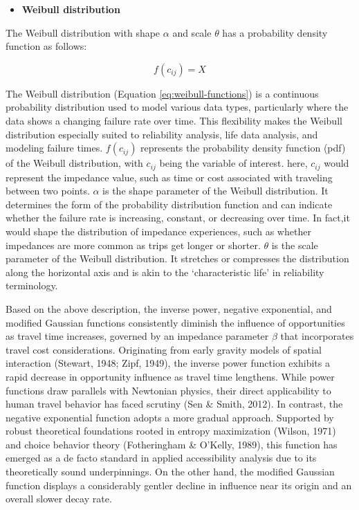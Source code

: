 \documentclass[
11pt, %
oneside, %
english, %
singlespacing, %
]{macthesis} %
\def\tightlist{}
\begin{document}
\begin{itemize}
\tightlist
\item
  \textbf{Weibull distribution}
\end{itemize}

The Weibull distribution with shape \(\alpha\) and scale \(\theta\) has a probability density function as follows:

\begin{equation}
f(c_{ij}) = X
\label{eq:weibull-functions}
\end{equation}

The Weibull distribution (Equation \ref{eq:weibull-functions}) is a continuous probability distribution used to model various data types, particularly where the data shows a changing failure rate over time. This flexibility makes the Weibull distribution especially suited to reliability analysis, life data analysis, and modeling failure times. \(f(c_{ij})\) represents the probability density function (pdf) of the Weibull distribution, with \(c_{ij}\) being the variable of interest. here, \(c_{ij}\) would represent the impedance value, such as time or cost associated with traveling between two points. \(\alpha\) is the shape parameter of the Weibull distribution. It determines the form of the probability distribution function and can indicate whether the failure rate is increasing, constant, or decreasing over time. In fact,it would shape the distribution of impedance experiences, such as whether impedances are more common as trips get longer or shorter. \(\theta\) is the scale parameter of the Weibull distribution. It stretches or compresses the distribution along the horizontal axis and is akin to the `characteristic life' in reliability terminology.

Based on the above description, the inverse power, negative exponential, and modified Gaussian functions consistently diminish the influence of opportunities as travel time increases, governed by an impedance parameter \(\beta\) that incorporates travel cost considerations. Originating from early gravity models of spatial interaction (Stewart, 1948; Zipf, 1949), the inverse power function exhibits a rapid decrease in opportunity influence as travel time lengthens. While power functions draw parallels with Newtonian physics, their direct applicability to human travel behavior has faced scrutiny (Sen \& Smith, 2012). In contrast, the negative exponential function adopts a more gradual approach. Supported by robust theoretical foundations rooted in entropy maximization (Wilson, 1971) and choice behavior theory (Fotheringham \& O'Kelly, 1989), this function has emerged as a de facto standard in applied accessibility analysis due to its theoretically sound underpinnings. On the other hand, the modified Gaussian function displays a considerably gentler decline in influence near its origin and an overall slower decay rate.
\end{document}
